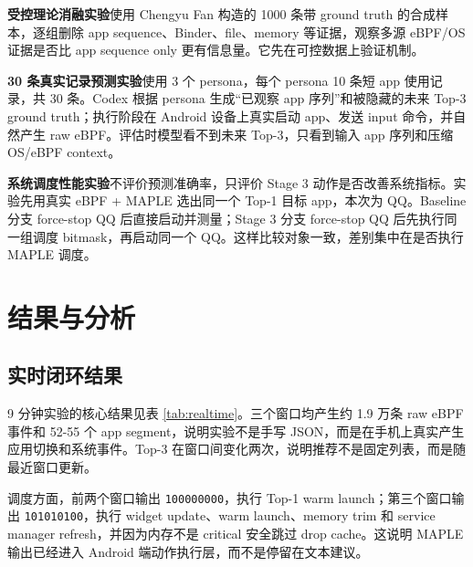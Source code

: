 \textbf{受控理论消融实验}使用 Chengyu Fan 构造的 1000 条带 ground truth 的合成样本，逐组删除 app sequence、Binder、file、memory 等证据，观察多源 eBPF/OS 证据是否比 app sequence only 更有信息量。它先在可控数据上验证机制。

\textbf{30 条真实记录预测实验}使用 3 个 persona，每个 persona 10 条短 app 使用记录，共 30 条。Codex 根据 persona 生成“已观察 app 序列”和被隐藏的未来 Top-3 ground truth；执行阶段在 Android 设备上真实启动 app、发送 input 命令，并自然产生 raw eBPF。评估时模型看不到未来 Top-3，只看到输入 app 序列和压缩 OS/eBPF context。

\textbf{系统调度性能实验}不评价预测准确率，只评价 Stage 3 动作是否改善系统指标。实验先用真实 eBPF + MAPLE 选出同一个 Top-1 目标 app，本次为 QQ。Baseline 分支 force-stop QQ 后直接启动并测量；Stage 3 分支 force-stop QQ 后先执行同一组调度 bitmask，再启动同一个 QQ。这样比较对象一致，差别集中在是否执行 MAPLE 调度。

\section{结果与分析}

\subsection{实时闭环结果}

9 分钟实验的核心结果见表 \ref{tab:realtime}。三个窗口均产生约 1.9 万条 raw eBPF 事件和 52-55 个 app segment，说明实验不是手写 JSON，而是在手机上真实产生应用切换和系统事件。Top-3 在窗口间变化两次，说明推荐不是固定列表，而是随最近窗口更新。

\begin{table}[htbp]
\centering
\caption{9 分钟实时 Top-3 实验结果}
\label{tab:realtime}
\end{table}

调度方面，前两个窗口输出 \texttt{100000000}，执行 Top-1 warm launch；第三个窗口输出 \texttt{101010100}，执行 widget update、warm launch、memory trim 和 service manager refresh，并因为内存不是 critical 安全跳过 drop cache。这说明 MAPLE 输出已经进入 Android 端动作执行层，而不是停留在文本建议。

